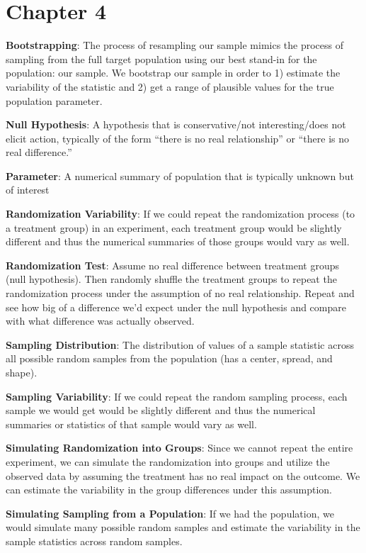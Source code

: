\documentclass[]{book}
\begin{document}
\hypertarget{chapter-4}{%
\section{Chapter 4}\label{chapter-4}}

\textbf{Bootstrapping}: The process of resampling our sample mimics the process of sampling from the full target population using our best stand-in for the population: our sample. We bootstrap our sample in order to 1) estimate the variability of the statistic and 2) get a range of plausible values for the true population parameter.

\textbf{Null Hypothesis}: A hypothesis that is conservative/not interesting/does not elicit action, typically of the form ``there is no real relationship'' or ``there is no real difference.''

\textbf{Parameter}: A numerical summary of population that is typically unknown but of interest

\textbf{Randomization Variability}: If we could repeat the randomization process (to a treatment group) in an experiment, each treatment group would be slightly different and thus the numerical summaries of those groups would vary as well.

\textbf{Randomization Test}: Assume no real difference between treatment groups (null hypothesis). Then randomly shuffle the treatment groups to repeat the randomization process under the assumption of no real relationship. Repeat and see how big of a difference we'd expect under the null hypothesis and compare with what difference was actually observed.

\textbf{Sampling Distribution}: The distribution of values of a sample statistic across all possible random samples from the population (has a center, spread, and shape).

\textbf{Sampling Variability}: If we could repeat the random sampling process, each sample we would get would be slightly different and thus the numerical summaries or statistics of that sample would vary as well.

\textbf{Simulating Randomization into Groups}: Since we cannot repeat the entire experiment, we can simulate the randomization into groups and utilize the observed data by assuming the treatment has no real impact on the outcome. We can estimate the variability in the group differences under this assumption.

\textbf{Simulating Sampling from a Population}: If we had the population, we would simulate many possible random samples and estimate the variability in the sample statistics across random samples.
\end{document}
